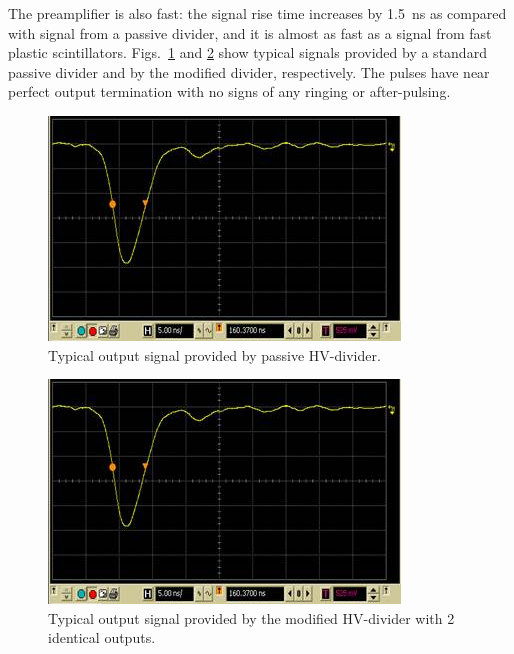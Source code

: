 The preamplifier is also fast: the signal rise time increases by 1.5~ns as compared with signal from a passive divider,
and it is almost as fast as a signal from fast plastic scintillators. Figs.~\ref{fig:POPOV_2} and \ref{fig:POPOV_3}
show typical signals provided by a standard passive divider and by the modified divider, respectively. The pulses
have near perfect output termination with no signs of any ringing or after-pulsing.

\begin{figure}[!ht]
    \centering
    \includegraphics[width=1.0\linewidth,trim={0.0cm 0.0cm 0.0cm 0.0cm},clip]{images/POPOV_2.jpg}
    \caption{Typical output signal provided by passive HV-divider.}
    \label{fig:POPOV_2}
\end{figure}

\begin{figure}[!ht]
    \centering
    \includegraphics[width=1.0\linewidth,trim={0.0cm 0.0cm 0.0cm 0.0cm},clip]{images/POPOV_3.jpg}
    \caption{Typical output signal provided by the modified HV-divider with 2 identical outputs.}
    \label{fig:POPOV_3}
\end{figure}

